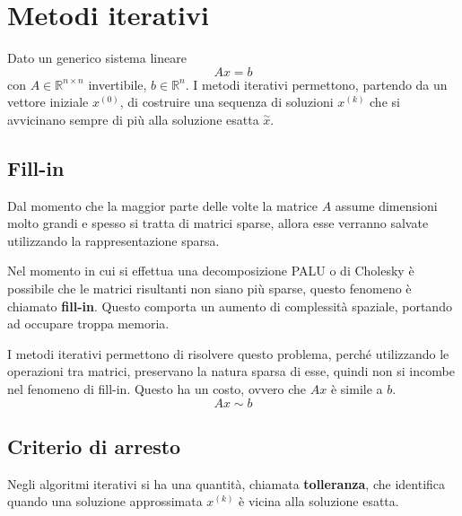 \chapter{Metodi iterativi}
Dato un generico sistema lineare
\begin{equation*}
    Ax=b
\end{equation*}
con $A \in \mathbb{R}^{n \times n}$ invertibile, $b \in \mathbb{R}^n$. I metodi
iterativi permettono, partendo da un vettore iniziale $x^{(0)}$, di costruire una
sequenza di soluzioni $x^{(k)}$ che si avvicinano sempre di più alla soluzione
esatta $\stackrel{\sim}{x}$.
\section{Fill-in}
Dal momento che la maggior parte delle volte la matrice $A$ assume dimensioni molto
grandi e spesso si tratta di matrici sparse, allora esse verranno salvate utilizzando
la rappresentazione sparsa.

Nel momento in cui si effettua una decomposizione PALU o di Cholesky è possibile
che le matrici risultanti non siano più sparse, questo fenomeno è chiamato
\textbf{fill-in}. Questo comporta un aumento di complessità spaziale, portando
ad occupare troppa memoria.

I metodi iterativi permettono di risolvere questo problema, perché utilizzando
le operazioni tra matrici, preservano la natura sparsa di esse, quindi non si
incombe nel fenomeno di fill-in. Questo ha un costo, ovvero che $Ax$ è simile
a $b$.
\begin{equation*}
    Ax \sim b
\end{equation*}
\section{Criterio di arresto}
Negli algoritmi iterativi si ha una quantità, chiamata \textbf{tolleranza}, che
identifica quando una soluzione approssimata $x^{(k)}$ è vicina alla soluzione
esatta.

